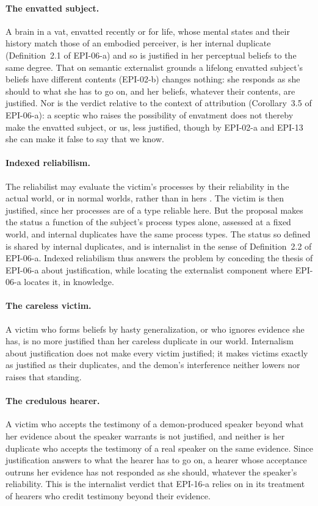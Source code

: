 \documentclass{situationist-preprint}
\begin{document}
\paragraph{The envatted subject.} A brain in a vat, envatted recently or for life, whose mental states and their history match those of an embodied perceiver, is her internal duplicate (Definition~2.1 of EPI-06-a) and so is justified in her perceptual beliefs to the same degree. That on semantic externalist grounds a lifelong envatted subject's beliefs have different contents (EPI-02-b) changes nothing: she responds as she should to what she has to go on, and her beliefs, whatever their contents, are justified. Nor is the verdict relative to the context of attribution (Corollary~3.5 of EPI-06-a): a sceptic who raises the possibility of envatment does not thereby make the envatted subject, or us, less justified, though by EPI-02-a and EPI-13 she can make it false to say that we know.

\paragraph{Indexed reliabilism.} The reliabilist may evaluate the victim's processes by their reliability in the actual world, or in normal worlds, rather than in hers \citep{Sosa1991,Comesana2002}. The victim is then justified, since her processes are of a type reliable here. But the proposal makes the status a function of the subject's process types alone, assessed at a fixed world, and internal duplicates have the same process types. The status so defined is shared by internal duplicates, and is internalist in the sense of Definition~2.2 of EPI-06-a. Indexed reliabilism thus answers the problem by conceding the thesis of EPI-06-a about justification, while locating the externalist component where EPI-06-a locates it, in knowledge.

\paragraph{The careless victim.} A victim who forms beliefs by hasty generalization, or who ignores evidence she has, is no more justified than her careless duplicate in our world. Internalism about justification does not make every victim justified; it makes victims exactly as justified as their duplicates, and the demon's interference neither lowers nor raises that standing.

\paragraph{The credulous hearer.} A victim who accepts the testimony of a demon-produced speaker beyond what her evidence about the speaker warrants is not justified, and neither is her duplicate who accepts the testimony of a real speaker on the same evidence. Since justification answers to what the hearer has to go on, a hearer whose acceptance outruns her evidence has not responded as she should, whatever the speaker's reliability. This is the internalist verdict that EPI-16-a relies on in its treatment of hearers who credit testimony beyond their evidence.
\end{document}
